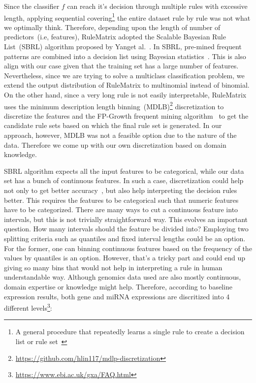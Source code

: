 \hspace*{3.5mm} Since the classifier $f$ can reach it's decision through multiple rules with excessive length, applying sequential covering\footnote{A general procedure that repeatedly learns a single rule to create a decision list or rule set~\cite{molnar2019interpretable}} the entire dataset rule by rule was not what we optimally think. Therefore, depending upon the length of number of predictors~(i.e, features), RuleMatrix adopted the Scalable Bayesian Rule List~(SBRL) algorithm proposed by Yanget al.~\cite{BayesianRule}. In SBRL, pre-mined frequent patterns are combined into a decision list using Bayesian statistics~\cite{molnar2019interpretable}. 
This is also align with our case given that the training set has a large number of features. Nevertheless, since we are trying to solve a multiclass classification problem, we extend the output distribution of RuleMatrix to multinomial instead of binomial. On the other hand, since a very long rule is not easily interpretable, RuleMatrix uses the minimum description length binning~(MDLB)\footnote{\url{https://github.com/hlin117/mdlp-discretization}} discretization to discretize the features and the FP-Growth frequent mining algorithm~\cite{han2000mining} to get the candidate rule sets based on which the final rule set is generated. In our approach, however, MDLB was not a feasible option due to the nature of the data. Therefore we come up with our own discretization based on domain knowledge.

\hspace*{3.5mm} SBRL algorithm expects all the input features to be categorical, while our data set has a bunch of continuous features. In such a case, discretization could help not only to get better accuracy~\cite{maslove2013discretization}, but also help interpreting the decision rules better. This requires the features to be categorical such that numeric features have to be categorized. There are many ways to cut a continuous feature into intervals, but this is not trivially straightforward way. This evolves an important question. How many intervals should the feature be divided into? Employing two splitting criteria such as quantiles and fixed interval lengths could be an option. For the former, one can binning continuous features based on the frequency of the values by quantiles is an option. However, that's a tricky part and could end up giving so many bins that would not help in interpreting a rule in human understandable way. Although genomics data used are also mostly continuous, domain expertise or knowledge might help. Therefore, according to baseline expression results, both gene and miRNA expressions are discritized into 4 different levels\footnote{\url{https://www.ebi.ac.uk/gxa/FAQ.html}}:

